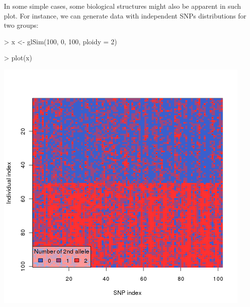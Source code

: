 \documentclass{article}
\begin{document}
In some simple cases, some biological structures might also be apparent in such plot.
For instance, we can generate data with independent SNPs distributions for two groups:
\begin{Schunk}
\begin{Sinput}
> x <- glSim(100, 0, 100, ploidy = 2)
\end{Sinput}
\end{Schunk}
\begin{Schunk}
\begin{Sinput}
> plot(x)
\end{Sinput}
\end{Schunk}
\begin{center}
  \includegraphics{figs/glsim1}
\end{center}
\end{document}
